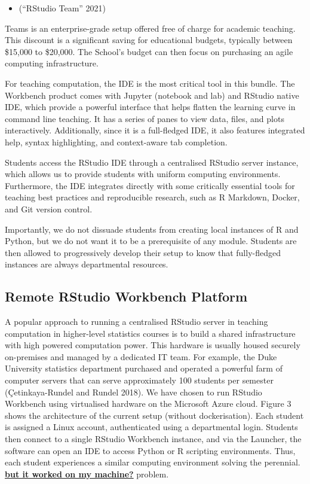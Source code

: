 \documentclass{article}
\begin{document}
\begin{itemize}
\tightlist
\item
  (``RStudio Team'' 2021)
\end{itemize}

Teams is an enterprise-grade setup offered free of charge for academic
teaching. This discount is a significant saving for educational budgets,
typically between \$15,000 to \$20,000. The School's budget can then
focus on purchasing an agile computing infrastructure.

For teaching computation, the IDE is the most critical tool in this
bundle. The Workbench product comes with Jupyter (notebook and lab) and
RStudio native IDE, which provide a powerful interface that helps
flatten the learning curve in command line teaching. It has a series of
panes to view data, files, and plots interactively. Additionally, since
it is a full-fledged IDE, it also features integrated help, syntax
highlighting, and context-aware tab completion.

Students access the RStudio IDE through a centralised RStudio server
instance, which allows us to provide students with uniform computing
environments. Furthermore, the IDE integrates directly with some
critically essential tools for teaching best practices and reproducible
research, such as R Markdown, Docker, and Git version control.

Importantly, we do not dissuade students from creating local instances
of R and Python, but we do not want it to be a prerequisite of any
module. Students are then allowed to progressively develop their setup
to know that fully-fledged instances are always departmental resources.

\hypertarget{remote-rstudio-workbench-platform}{%
\subsection{Remote RStudio Workbench
Platform}\label{remote-rstudio-workbench-platform}}

A popular approach to running a centralised RStudio server in teaching
computation in higher-level statistics courses is to build a shared
infrastructure with high powered computation power. This hardware is
usually housed securely on-premises and managed by a dedicated IT team.
For example, the Duke University statistics department purchased and
operated a powerful farm of computer servers that can serve
approximately 100 students per semester (Çetinkaya-Rundel and Rundel
2018). We have chosen to run RStudio Workbench using virtualised
hardware on the Microsoft Azure cloud. Figure 3 shows the architecture
of the current setup (without dockerisation). Each student is assigned a
Linux account, authenticated using a departmental login. Students then
connect to a single RStudio Workbench instance, and via the Launcher,
the software can open an IDE to access Python or R scripting
environments. Thus, each student experiences a similar computing
environment solving the perennial.
\href{https://www.kevinwanke.com/why-you-should-never-use-the-phrase-but-it-works-on-my-machine/}{\textbf{but
it worked on my machine?}} problem.
\end{document}
